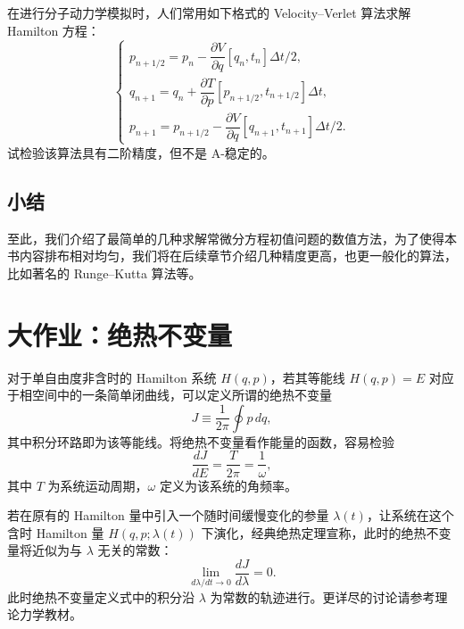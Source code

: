 \begin{exerciseBox}[练习 2.5]
在进行分子动力学模拟时，人们常用如下格式的 Velocity--Verlet 算法求解 Hamilton 方程：
\begin{equation}
\begin{cases}
p_{n+1/2}=p_n-\dfrac{\partial V}{\partial q}[q_n,t_n]\Delta t/2,\\[1ex]
q_{n+1}=q_n+\dfrac{\partial T}{\partial p}[p_{n+1/2},t_{n+1/2}]\Delta t,\\[1ex]
p_{n+1}=p_{n+1/2}-\dfrac{\partial V}{\partial q}[q_{n+1},t_{n+1}]\Delta t/2.
\end{cases}
\tag{2.6.17}
\end{equation}
试检验该算法具有二阶精度，但不是 A-稳定的。
\end{exerciseBox}

\subsection{小结}

至此，我们介绍了最简单的几种求解常微分方程初值问题的数值方法，为了使得本书内容排布相对均匀，我们将在后续章节介绍几种精度更高，也更一般化的算法，比如著名的 Runge--Kutta 算法等。

\section*{大作业：绝热不变量}

对于单自由度非含时的 Hamilton 系统 $H(q,p)$，若其等能线 $H(q,p)=E$ 对应于相空间中的一条简单闭曲线，可以定义所谓的绝热不变量
\begin{equation}
J\equiv\frac{1}{2\pi}\oint p\,dq,
\tag{1}
\end{equation}
其中积分环路即为该等能线。将绝热不变量看作能量的函数，容易检验
\begin{equation}
\frac{dJ}{dE}=\frac{T}{2\pi}=\frac1\omega,
\tag{2}
\end{equation}
其中 $T$ 为系统运动周期，$\omega$ 定义为该系统的角频率。

若在原有的 Hamilton 量中引入一个随时间缓慢变化的参量 $\lambda(t)$，让系统在这个含时 Hamilton 量 $H(q,p;\lambda(t))$ 下演化，经典绝热定理宣称，此时的绝热不变量将近似为与 $\lambda$ 无关的常数：
\begin{equation}
\lim_{d\lambda/dt\to0}\frac{dJ}{d\lambda}=0.
\tag{3}
\end{equation}
此时绝热不变量定义式中的积分沿 $\lambda$ 为常数的轨迹进行。更详尽的讨论请参考理论力学教材。

